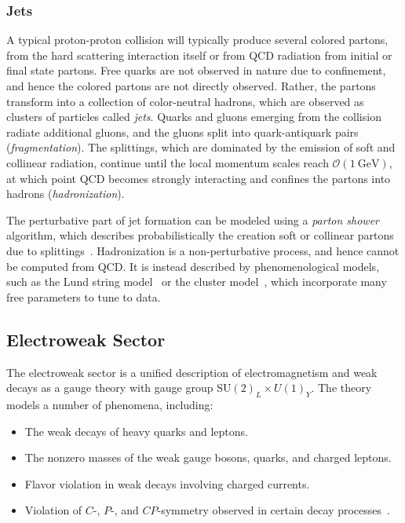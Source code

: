 \subsubsection{Jets}
A typical proton-proton collision will typically produce several colored partons, from the hard scattering interaction itself or from QCD radiation from initial or final state partons. Free quarks are not observed in nature due to confinement, and hence the colored partons are not directly observed. Rather, the partons transform into a collection of color-neutral hadrons, which are observed as clusters of particles called \emph{jets}. Quarks and gluons emerging from the collision radiate additional gluons, and the gluons split into quark-antiquark pairs (\emph{fragmentation}). The splittings, which are dominated by the emission of soft and collinear radiation, continue until the local momentum scales reach $\mathcal{O}(\SI{1}{\giga\electronvolt})$, at which point QCD becomes strongly interacting and confines the partons into hadrons (\emph{hadronization}). 

The perturbative part of jet formation can be modeled using a \emph{parton shower} algorithm, which describes probabilistically the creation soft or collinear partons due to splittings~\cite{Buckley:2011ms}. Hadronization is a non-perturbative process, and hence cannot be computed from QCD. It is instead described by phenomenological models, such as the Lund string model~\cite{Andersson:1983ia} or the cluster model~\cite{Webber:1983if}, which incorporate many free parameters to tune to data. 


\subsection{Electroweak Sector}
The electroweak sector is a unified description of electromagnetism and weak decays as a gauge theory with gauge group $\mathrm{SU}(2)_L\times U(1)_Y$. The theory models a number of phenomena, including:
\begin{itemize}
	\item The weak decays of heavy quarks and leptons.
	\item The nonzero masses of the weak gauge bosons, quarks, and charged leptons.
	\item Flavor violation in weak decays involving charged currents.
	\item Violation of $C$-, $P$-, and $CP$-symmetry observed in certain decay processes~\cite{Wu:1957my,Christenson:1964fg,Collaboration:1999jz,AlaviHarati:1999xp}.
\end{itemize}

